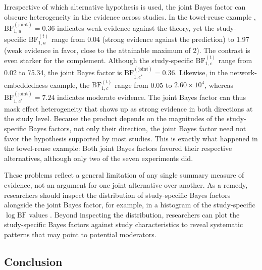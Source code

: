 \documentclass[letterpaper,11pt,oneside]{article}
\begin{document}
Irrespective of which alternative hypothesis is used, the joint Bayes factor can obscure heterogeneity in the evidence across studies. In the towel-reuse example \parencite{scheibehenneBayesianEvidenceSynthesis2016}, \mbox{$\mathrm{BF}_{1,u}^{(\text{joint})} = 0.36$} indicates weak evidence against the theory, yet the study-specific $\mathrm{BF}_{1,u}^{(t)}$ range from 0.04 (strong evidence against the prediction) to 1.97 (weak evidence in favor, close to the attainable maximum of 2). The contrast is even starker for the complement. Although the study-specific $\mathrm{BF}_{1,c}^{(t)}$ range from 0.02 to 75.34, the joint Bayes factor is \mbox{$\mathrm{BF}_{1,c^{*}}^{(\text{joint})} = 0.36$}. Likewise, in the network-embeddedness example, the $\mathrm{BF}_{1,c}^{(t)}$ range from 0.05 to $2.60 \times 10^4$, whereas \mbox{$\mathrm{BF}_{1,c^{*}}^{(\text{joint})} = 7.24$} indicates moderate evidence. The joint Bayes factor can thus mask effect heterogeneity that shows up as strong evidence in both directions at the study level. Because the product depends on the magnitudes of the study-specific Bayes factors, not only their direction, the joint Bayes factor need not favor the hypothesis supported by most studies. This is exactly what happened in the towel-reuse example: Both joint Bayes factors favored their respective alternatives, although only two of the seven experiments did.

These problems reflect a general limitation of any single summary measure of evidence, not an argument for one joint alternative over another. As a remedy, researchers should inspect the distribution of study-specific Bayes factors alongside the joint Bayes factor, for example, in a histogram of the study-specific $\log \mathrm{BF}$ values \parencite[for examples with heterogeneous person-specific Bayes factors, see][]{stephanBayesianModelSelection2009}. Beyond inspecting the distribution, researchers can plot the study-specific Bayes factors against study characteristics to reveal systematic patterns that may point to potential moderators.

\subsection{Conclusion}
\end{document}
